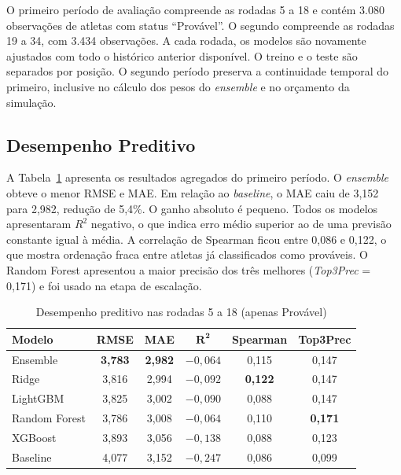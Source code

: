 \documentclass[12pt, a4paper, oneside]{article}
\begin{document}
O primeiro período de avaliação compreende as rodadas 5 a 18 e contém 3.080
observações de atletas com status ``Provável''. O segundo compreende as rodadas
19 a 34, com 3.434 observações. A cada rodada, os modelos são novamente ajustados
com todo o histórico anterior disponível. O treino e o teste são separados por
posição. O segundo período preserva a continuidade temporal do primeiro, inclusive
no cálculo dos pesos do \textit{ensemble} e no orçamento da simulação.

\subsection{Desempenho Preditivo}

A Tabela~\ref{tab:modelos} apresenta os resultados agregados do primeiro período.
O \textit{ensemble} obteve o menor RMSE e MAE. Em relação ao \textit{baseline},
o MAE caiu de 3,152 para 2,982, redução de 5,4\%. O ganho absoluto é pequeno.
Todos os modelos apresentaram $R^2$ negativo, o que indica erro médio superior ao
de uma previsão constante igual à média. A correlação de Spearman ficou entre
0,086 e 0,122, o que mostra ordenação fraca entre atletas já classificados como
prováveis. O Random Forest apresentou a maior precisão dos três melhores
(\textit{Top3Prec} = 0,171) e foi usado na etapa de escalação.

\begin{table}[H]
\centering
\small
\caption{Desempenho preditivo nas rodadas 5 a 18 (apenas Provável)}
\label{tab:modelos}
\begin{tabular}{lccccc}
\toprule
\textbf{Modelo} & \textbf{RMSE} & \textbf{MAE} & $\mathbf{R^2}$
& \textbf{Spearman} & \textbf{Top3Prec}\\
\midrule
Ensemble      & \textbf{3,783} & \textbf{2,982} & $-0{,}064$
              & 0,115 & 0,147\\
Ridge         & 3,816 & 2,994 & $-0{,}092$ & \textbf{0,122} & 0,147\\
LightGBM      & 3,825 & 3,002 & $-0{,}090$ & 0,088 & 0,147\\
Random Forest & 3,786 & 3,008 & $-0{,}064$ & 0,110 & \textbf{0,171}\\
XGBoost       & 3,893 & 3,056 & $-0{,}138$ & 0,088 & 0,123\\
Baseline      & 4,077 & 3,152 & $-0{,}247$ & 0,086 & 0,099\\
\bottomrule
\end{tabular}
\end{table}
\end{document}
